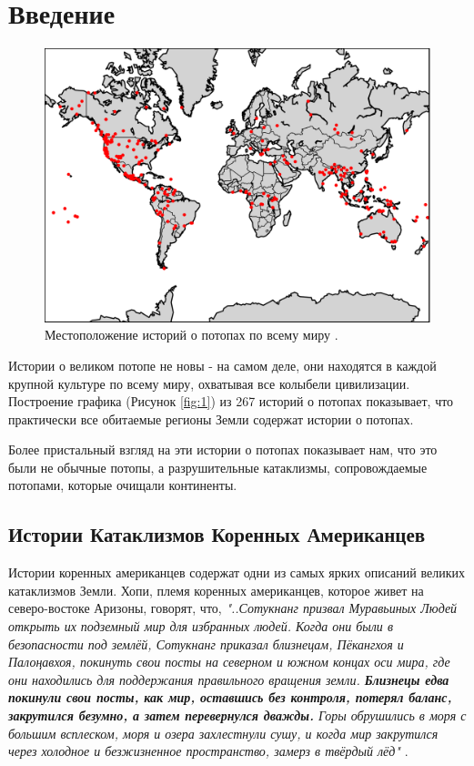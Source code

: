 \documentclass[10pt,twocolumn,letterpaper]{article}
\begin{document}
\section{Введение}
\begin{figure}[b]
\begin{center}
   \includegraphics[width=1\linewidth]{b.png}
\end{center}
   \caption{Местоположение историй о потопах по всему миру \cite{3}.}
\label{fig:1}
\label{fig:onecol}
\end{figure}
Истории о великом потопе не новы - на самом деле, они находятся в каждой крупной культуре по всему миру, охватывая все колыбели цивилизации. Построение графика (Рисунок \ref{fig:1}) из 267 историй о потопах \cite{3} показывает, что практически все обитаемые регионы Земли содержат истории о потопах.


Более пристальный взгляд на эти истории о потопах показывает нам, что это были не обычные потопы, а разрушительные катаклизмы, сопровождаемые потопами, которые очищали континенты.

\subsection{Истории Катаклизмов Коренных Американцев}

Истории коренных американцев содержат одни из самых ярких описаний великих катаклизмов Земли. Хопи, племя коренных американцев, которое живет на северо-востоке Аризоны, говорят, что, \textit{"..Сотукнанг призвал Муравьиных Людей открыть их подземный мир для избранных людей. Когда они были в безопасности под землёй, Сотукнанг приказал близнецам, Пёкангхоя и Палоңавхоя, покинуть свои посты на северном и южном концах оси мира, где они находились для поддержания правильного вращения земли. \textbf{Близнецы едва покинули свои посты, как мир, оставшись без контроля, потерял баланс, закрутился безумно, а затем перевернулся дважды.} Горы обрушились в моря с большим всплеском, моря и озера захлестнули сушу, и когда мир закрутился через холодное и безжизненное пространство, замерз в твёрдый лёд"} \cite{4}.
\end{document}

